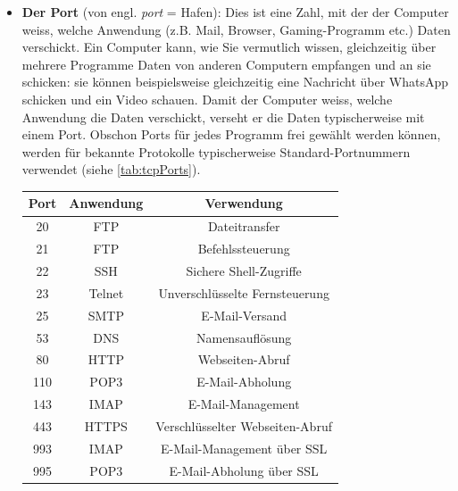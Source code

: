 \begin{itemize}
	\item \textbf{Der Port} (von engl. \textit{port} = Hafen): Dies ist eine Zahl, mit der der Computer weiss, welche Anwendung (z.B. Mail, Browser, Gaming-Programm etc.) Daten verschickt. Ein Computer kann, wie Sie vermutlich wissen, gleichzeitig über mehrere Programme Daten von anderen Computern empfangen und an sie schicken: sie können beispielsweise gleichzeitig eine Nachricht über WhatsApp schicken und ein Video schauen. Damit der Computer weiss, welche Anwendung die Daten verschickt, verseht er die Daten typischerweise mit einem Port. Obschon Ports für jedes Programm frei gewählt werden können, werden für bekannte Protokolle typischerweise Standard-Portnummern verwendet (siehe \cref{tab:tcpPorts}).
	      \begin{table}[H]
		      \centering
		      \begin{tabular}{c||c|c}
			      \toprule
			      \textbf{Port} & \textbf{Anwendung} & \textbf{Verwendung}                   \\
			      \midrule
			      20            & \acrfull{FTP}      & Dateitransfer                         \\
			      21            & \acrfull{FTP}      & Befehlssteuerung                      \\
			      22            & \acrfull{SSH}      & Sichere Shell-Zugriffe                \\
			      23            & Telnet             & Unverschlüsselte Fernsteuerung        \\
			      25            & \acrfull{SMTP}     & E-Mail-Versand                        \\
			      53            & \acrfull{DNS}      & Namensauflösung                       \\
			      80            & \acrfull{HTTP}     & Webseiten-Abruf                       \\
			      110           & \acrfull{POP3}     & E-Mail-Abholung                       \\
			      143           & \acrfull{IMAP}     & E-Mail-Management                     \\
			      443           & \acrfull{HTTPS}    & Verschlüsselter Webseiten-Abruf       \\
			      993           & \acrfull{IMAP}     & E-Mail-Management über \acrshort{SSL} \\
			      995           & \acrfull{POP3}     & E-Mail-Abholung über \acrshort{SSL}   \\

\end{tabular}
\end{table}
\end{itemize}
